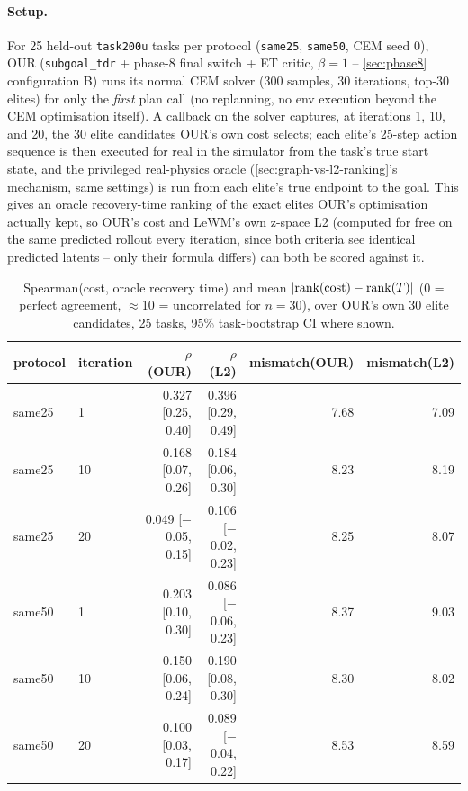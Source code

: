 \documentclass[11pt]{article}
\begin{document}
\paragraph{Setup.} For 25 held-out \texttt{task200u} tasks per protocol (\texttt{same25},
\texttt{same50}, CEM seed 0), OUR (\texttt{subgoal\_tdr} + phase-8 final switch + ET critic,
$\beta=1$ -- \cref{sec:phase8} configuration B) runs its normal CEM solver (300 samples, 30
iterations, top-30 elites) for only the \emph{first} plan call (no replanning, no env
execution beyond the CEM optimisation itself). A callback on the solver captures, at
iterations 1, 10, and 20, the 30 elite candidates OUR's own cost selects; each elite's
25-step action sequence is then executed for real in the simulator from the task's true
start state, and the privileged real-physics oracle (\cref{sec:graph-vs-l2-ranking}'s
mechanism, same settings) is run from each elite's true endpoint to the goal. This gives an
oracle recovery-time ranking of the exact elites OUR's optimisation actually kept, so OUR's
cost and LeWM's own z-space L2 (computed for free on the same predicted rollout every
iteration, since both criteria see identical predicted latents -- only their formula differs)
can both be scored against it.

\begin{table}[H]
\centering\small
\caption{Spearman(cost, oracle recovery time) and mean $|{\rm rank(cost)}-{\rm rank}(T)|$
(0 = perfect agreement, $\approx$10 = uncorrelated for $n=30$), over OUR's own 30 elite
candidates, 25 tasks, 95\% task-bootstrap CI where shown.}
\label{tab:cem-trace-audit}
\begin{tabular}{llrrrr}
\toprule
protocol & iteration & $\rho$(OUR) & $\rho$(L2) & mismatch(OUR) & mismatch(L2) \\
\midrule
same25 & 1  & 0.327 [0.25, 0.40]   & 0.396 [0.29, 0.49]   & 7.68 & 7.09 \\
same25 & 10 & 0.168 [0.07, 0.26]   & 0.184 [0.06, 0.30]   & 8.23 & 8.19 \\
same25 & 20 & 0.049 [$-$0.05, 0.15] & 0.106 [$-$0.02, 0.23] & 8.25 & 8.07 \\
same50 & 1  & 0.203 [0.10, 0.30]   & 0.086 [$-$0.06, 0.23] & 8.37 & 9.03 \\
same50 & 10 & 0.150 [0.06, 0.24]   & 0.190 [0.08, 0.30]   & 8.30 & 8.02 \\
same50 & 20 & 0.100 [0.03, 0.17]   & 0.089 [$-$0.04, 0.22] & 8.53 & 8.59 \\
\bottomrule
\end{tabular}
\end{table}
\end{document}
